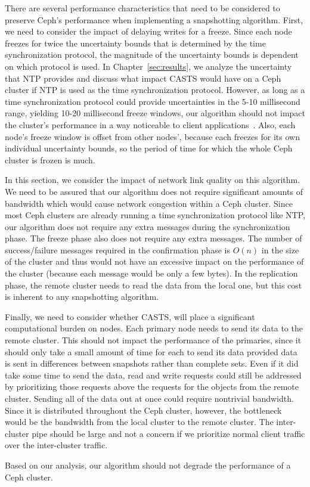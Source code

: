 There are several performance characteristics that need to be
considered to preserve Ceph's performance when implementing a
snapshotting algorithm. First, we need to consider the impact of
delaying writes for a freeze. Since each node freezes for twice the
uncertainty bounds that is determined by the time synchronization
protocol, the magnitude of the uncertainty bounds is dependent on
which protocol is used. In Chapter~\ref{sec:results}, we analyze the
uncertainty that NTP provides and discuss what impact CASTS would have
on a Ceph cluster if NTP is used as the time synchronization
protocol. However, as long as a time synchronization protocol could
provide uncertainties in the 5-10 millisecond range, yielding 10-20
millisecond freeze windows, our algorithm should not impact the
cluster's performance in a way noticeable to client
applications~\parencite{Sage}. Also, each node's freeze window is
offset from other nodes', because each freezes for its own individual
uncertainty bounds, so the period of time for which the whole Ceph cluster is
frozen is much.

In this section, we consider the impact of network link quality on
this algorithm. We need to be assured that our algorithm does not
require significant amounts of bandwidth which would cause network
congestion within a Ceph cluster. Since most Ceph clusters are already
running a time synchronization protocol like NTP, our algorithm does
not require any extra messages during the synchronization phase. The
freeze phase also does not require any extra messages. The number of
success/failure messages required in the confirmation phase is $O(n)$
in the size of the cluster and thus would not have an excessive impact
on the performance of the cluster (because each message would be only
a few bytes). In the replication phase, the remote cluster needs to
read the data from the local one, but this cost is inherent to any
snapshotting algorithm.

Finally, we need to consider whether CASTS, will place a significant
computational burden on nodes. Each primary node needs to send its
data to the remote cluster. This should not impact the performance of
the primaries, since it should only take a small amount of time for
each to send its data provided data is sent in differences between
snapshots rather than complete sets. Even if it did take some time to
send the data, read and write requests could still be addressed by
prioritizing those requests above the requests for the objects from
the remote cluster. Sending all of the data out at once could require
nontrivial bandwidth. Since it is distributed throughout the Ceph
cluster, however, the bottleneck would be the bandwidth from the local
cluster to the remote cluster. The inter-cluster pipe should be
large and not a concern if we prioritize normal client traffic over
the inter-cluster traffic.

Based on our analysis, our algorithm should not degrade the
performance of a Ceph cluster.
